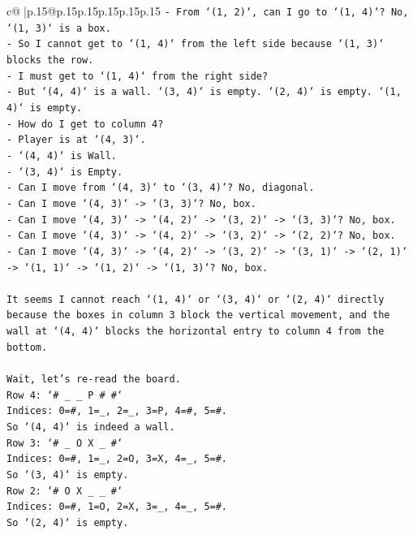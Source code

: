 \documentclass{article}
\begin{document}
{\begin{supertabular}{c@{$\;$}|p{.15\linewidth}@{}p{.15\linewidth}p{.15\linewidth}p{.15\linewidth}p{.15\linewidth}p{.15\linewidth}}
{{{\texttt{{-} From `(1, 2)`, can I go to `(1, 4)`? No, `(1, 3)` is a box.} \\
\texttt{{-} So I cannot get to `(1, 4)` from the left side because `(1, 3)` blocks the row.} \\
\texttt{{-} I must get to `(1, 4)` from the right side?} \\
\texttt{{-} But `(4, 4)` is a wall. `(3, 4)` is empty. `(2, 4)` is empty. `(1, 4)` is empty.} \\
\texttt{{-} How do I get to column 4?} \\
\texttt{{-} Player is at `(4, 3)`.} \\
\texttt{{-} `(4, 4)` is Wall.} \\
\texttt{{-} `(3, 4)` is Empty.} \\
\texttt{{-} Can I move from `(4, 3)` to `(3, 4)`? No, diagonal.} \\
\texttt{{-} Can I move `(4, 3)` {-}> `(3, 3)`? No, box.} \\
\texttt{{-} Can I move `(4, 3)` {-}> `(4, 2)` {-}> `(3, 2)` {-}> `(3, 3)`? No, box.} \\
\texttt{{-} Can I move `(4, 3)` {-}> `(4, 2)` {-}> `(3, 2)` {-}> `(2, 2)`? No, box.} \\
\texttt{{-} Can I move `(4, 3)` {-}> `(4, 2)` {-}> `(3, 2)` {-}> `(3, 1)` {-}> `(2, 1)` {-}> `(1, 1)` {-}> `(1, 2)` {-}> `(1, 3)`? No, box.} \\
\\ 
\texttt{It seems I cannot reach `(1, 4)` or `(3, 4)` or `(2, 4)` directly because the boxes in column 3 block the vertical movement, and the wall at `(4, 4)` blocks the horizontal entry to column 4 from the bottom.} \\
\\ 
\texttt{Wait, let's re{-}read the board.} \\
\texttt{Row 4: `\# \_ \_ P \# \#`} \\
\texttt{Indices: 0=\#, 1=\_, 2=\_, 3=P, 4=\#, 5=\#.} \\
\texttt{So `(4, 4)` is indeed a wall.} \\
\texttt{Row 3: `\# \_ O X \_ \#`} \\
\texttt{Indices: 0=\#, 1=\_, 2=O, 3=X, 4=\_, 5=\#.} \\
\texttt{So `(3, 4)` is empty.} \\
\texttt{Row 2: `\# O X \_ \_ \#`} \\
\texttt{Indices: 0=\#, 1=O, 2=X, 3=\_, 4=\_, 5=\#.} \\
\texttt{So `(2, 4)` is empty.} \\
}}}
\end{supertabular}}
\end{document}
